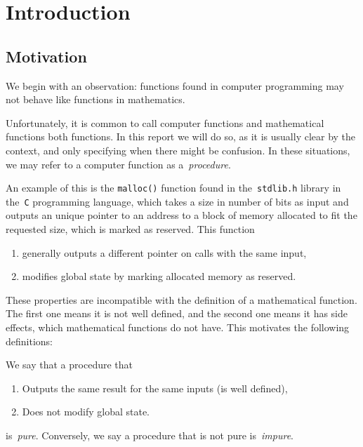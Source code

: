 \documentclass[../TGF.tex]{subfiles}
\begin{document}
\section{Introduction}
\subsection{Motivation}
\label{sec:motivation}
We begin with an observation: functions found in computer programming may not
behave like functions in mathematics.

Unfortunately, it is common to call computer functions and mathematical
functions both functions. In this report we will do so, as it is usually clear
by the context, and only specifying when there might be confusion. In these
situations, we may refer to a computer function as a~\emph{procedure}.

An example of this is the \texttt{malloc()} function found in
the~\texttt{stdlib.h} library in the~\texttt{C} programming
language, which takes a size in number of bits as input and outputs an unique
pointer to an address to a block of memory allocated to fit the requested size,
which is marked as reserved. This function

\begin{enumerate}
    \item generally outputs a different pointer on calls with the same input,
    \item modifies global state by marking allocated memory as reserved.
\end{enumerate}

These properties are incompatible with the definition of a mathematical
function. The first one means it is not well defined, and the second one means
it has side effects, which mathematical functions do not have. This motivates
the following definitions:

\begin{definition}
    We say that a procedure that
    \begin{enumerate}
        \item Outputs the same result for the same inputs (\ie is well defined),

        \item Does not modify global state.
    \end{enumerate}
    is~\emph{pure}.
    Conversely, we say a procedure that is not pure is~\emph{impure}.
\end{definition}
\end{document}
